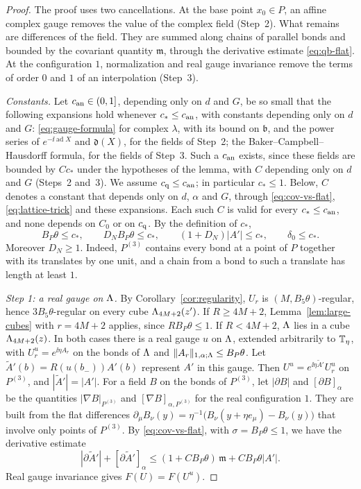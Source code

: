 \begin{proof}
The proof uses two cancellations. At the base point $x_0\in P$, an affine complex gauge removes the value of the complex field (Step~2). What remains are differences of the field. They are summed along chains of parallel bonds and bounded by the covariant quantity $\mathfrak m$, through the derivative estimate \eqref{eq:qb-flat}. At the configuration $1$, normalization and real gauge invariance remove the terms of order $0$ and $1$ of an interpolation (Step~3).

\emph{Constants.} Let $c_{\rm an}\in(0,1]$, depending only on $d$ and $G$, be so small that the following expansions hold whenever $c_*\le c_{\rm an}$, with constants depending only on $d$ and $G$: \eqref{eq:gauge-formula} for complex $\lambda$, with its bound on $\mathfrak b$, and the power series of $e^{-\ii\operatorname{ad}X}$ and $\mathfrak d(X)$, for the fields of Step~2; the Baker--Campbell--Hausdorff formula, for the fields of Step~3. Such a $c_{\rm an}$ exists, since these fields are bounded by $Cc_*$ under the hypotheses of the lemma, with $C$ depending only on $d$ and $G$ (Steps~2 and~3). We assume $c_{\rm q}\le c_{\rm an}$; in particular $c_*\le1$. Below, $C$ denotes a constant that depends only on $d$, $\alpha$ and $G$, through \eqref{eq:cov-vs-flat}, \eqref{eq:lattice-trick} and these expansions. Each such $C$ is valid for every $c_*\le c_{\rm an}$, and none depends on $C_0$ or on $c_{\rm q}$. By the definition of $c_*$,
\[
B_P\theta\le c_*,\qquad D_NB_P\theta\le c_*,\qquad(1+D_N)|A'|\le c_*,\qquad\delta_0\le c_* .
\]
Moreover $D_N\ge1$. Indeed, $P^{(3)}$ contains every bond at a point of $P$ together with its translates by one unit, and a chain from a bond to such a translate has length at least $1$.

\emph{Step 1: a real gauge on $\Lambda$.} By Corollary~\ref{cor:regularity}, $U_r$ is $(M,B_5\theta)$-regular, hence $3B_5\theta$-regular on every cube $\Lambda_{4M+2}(z')$. If $R\ge4M+2$, Lemma~\ref{lem:large-cubes} with $r=4M+2$ applies, since $RB_P\theta\le1$. If $R<4M+2$, $\Lambda$ lies in a cube $\Lambda_{4M+2}(z)$. In both cases there is a real gauge $u$ on $\Lambda$, extended arbitrarily to $\mathbb T_\eta$, with $U_r^u=e^{\ii\eta A_r}$ on the bonds of $\Lambda$ and $\|A_r\|_{1,\alpha;\Lambda}\le B_P\theta$. Let $\tilde A'(b)=R(u(b_-))A'(b)$ represent $A'$ in this gauge. Then $U^u=e^{\ii\eta\tilde A'}U_r^u$ on $P^{(3)}$, and $|\tilde A'|=|A'|$. For a field $B$ on the bonds of $P^{(3)}$, let $|\partial B|$ and $[\partial B]_\alpha$ be the quantities $|\nabla B|_{P^{(3)}}$ and $[\nabla B]_{\alpha,P^{(3)}}$ for the real configuration $1$. They are built from the flat differences $\partial_\mu B_\nu(y)=\eta^{-1}\big(B_\nu(y+\eta e_\mu)-B_\nu(y)\big)$ that involve only points of $P^{(3)}$. By \eqref{eq:cov-vs-flat}, with $\sigma=B_P\theta\le1$, we have the derivative estimate
\begin{equation}\label{eq:qb-flat}
|\partial\tilde A'|+[\partial\tilde A']_\alpha\le(1+CB_P\theta)\,\mathfrak m+CB_P\theta|A'| .
\end{equation}
Real gauge invariance gives $F(U)=F(U^u)$.


\end{proof}

